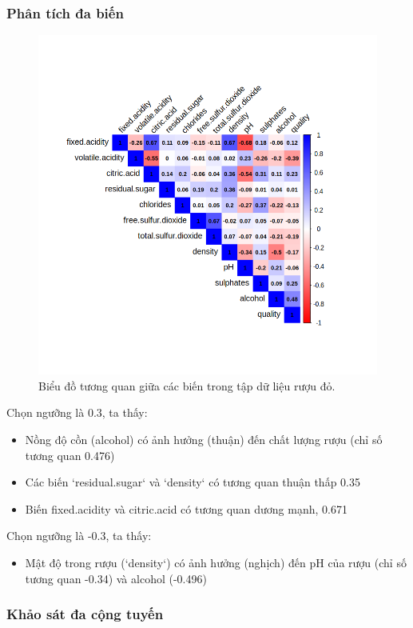 \subsubsection{Phân tích đa biến}

\begin{figure}[H]
    \centering
    \includegraphics[width=0.75\columnwidth]{wine_figures/red_corr.png}
    \caption{Biểu đồ tương quan giữa các biến trong tập dữ liệu rượu đỏ.}
    \label{fig:red_corr}
\end{figure}
Chọn ngưỡng là 0.3, ta thấy:
\begin{itemize}
    \item Nồng độ cồn (alcohol) có ảnh hưởng (thuận) đến chất lượng rượu (chỉ số tương quan 0.476)
    \item Các biến `residual.sugar` và `density` có tương quan thuận thấp 0.35
    \item Biến fixed.acidity và citric.acid có tương quan dương mạnh, 0.671
\end{itemize}
Chọn ngưỡng là -0.3, ta thấy:
\begin{itemize}
    \item Mật độ trong rượu (`density`) có ảnh hưởng (nghịch) đến pH của rượu (chỉ số tương quan -0.34) và alcohol (-0.496)
\end{itemize}


\subsubsection{Khảo sát đa cộng tuyến}

